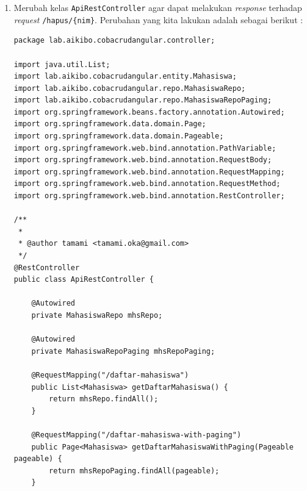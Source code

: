 \begin{enumerate}
\begin{lstlisting}
    $scope.ubah = function(mhs) {
        $window.location.href = 'edit-form?nim=' + mhs.nim;
    };
    
    (*\texttt{\$scope.hapus = function(mhs) \{ }*)
        (*\texttt{\$http.delete('/hapus/' + mhs.nim).then(sukses, gagal); }*)
        
        (*\texttt{function sukses(response) \{ }*)
            (*\texttt{\$scope.updateDaftarMahasiswa(); }*)
        (*\texttt{\}; }*)
        
        (*\texttt{function gagal(response) \{\} }*)
    (*\texttt{\}; }*)
    
    $scope.updateDaftarMahasiswa();
});
	\end{lstlisting}
	
	\item Merubah kelas \texttt{ApiRestController} agar dapat melakukan \textit{response} terhadap \textit{request} \texttt{/hapus/\{nim\}}. Perubahan yang kita lakukan adalah sebagai berikut :
	
	\begin{lstlisting}
package lab.aikibo.cobacrudangular.controller;

import java.util.List;
import lab.aikibo.cobacrudangular.entity.Mahasiswa;
import lab.aikibo.cobacrudangular.repo.MahasiswaRepo;
import lab.aikibo.cobacrudangular.repo.MahasiswaRepoPaging;
import org.springframework.beans.factory.annotation.Autowired;
import org.springframework.data.domain.Page;
import org.springframework.data.domain.Pageable;
import org.springframework.web.bind.annotation.PathVariable;
import org.springframework.web.bind.annotation.RequestBody;
import org.springframework.web.bind.annotation.RequestMapping;
import org.springframework.web.bind.annotation.RequestMethod;
import org.springframework.web.bind.annotation.RestController;

/**
 *
 * @author tamami <tamami.oka@gmail.com>
 */
@RestController
public class ApiRestController {
    
    @Autowired
    private MahasiswaRepo mhsRepo;
    
    @Autowired
    private MahasiswaRepoPaging mhsRepoPaging;
    
    @RequestMapping("/daftar-mahasiswa")
    public List<Mahasiswa> getDaftarMahasiswa() {
        return mhsRepo.findAll();
    }
    
    @RequestMapping("/daftar-mahasiswa-with-paging")
    public Page<Mahasiswa> getDaftarMahasiswaWithPaging(Pageable pageable) {
        return mhsRepoPaging.findAll(pageable);
    }
    

\end{lstlisting}
\end{enumerate}

